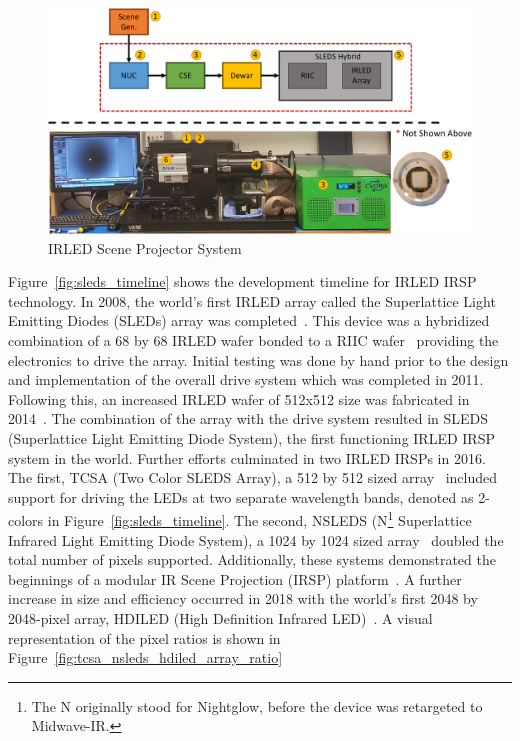     \begin{figure}
        \centering
        \includegraphics[width=1.0\textwidth]{fig/sleds_system.pdf}
        \caption{IRLED Scene Projector System}
        \label{fig:sleds_system}
    \end{figure}

    Figure~\ref{fig:sleds_timeline} shows the development timeline for IRLED IRSP technology. In 2008, the world's first IRLED array called the Superlattice Light Emitting Diodes (SLEDs) array was completed~\cite{AhmedEtAl2019}. This device was a hybridized combination of a 68 by 68 IRLED wafer bonded to a RIIC wafer~\cite{DasEtAl2009} providing the electronics to drive the array. Initial testing was done by hand prior to the design and implementation of the overall drive system which was completed in 2011. Following this, an increased IRLED wafer of 512x512 size was fabricated in 2014~\cite{NortonEtAl2013}. The combination of the array with the drive system resulted in SLEDS (Superlattice Light Emitting Diode System), the first functioning IRLED IRSP system in the world. Further efforts culminated in two IRLED IRSPs in 2016. The first, TCSA (Two Color SLEDS Array), a 512 by 512 sized array~\cite{McGeeEtAl2015, EjzakEtAl2016, EjzakEtAl2016_2, EjzakEtAl2017, RickerEtAl2017} included support for driving the LEDs at two separate wavelength bands, denoted as 2-colors in Figure~\ref{fig:sleds_timeline}. The second, NSLEDS (N\footnote{The N originally stood for Nightglow, before the device was retargeted to Midwave-IR.} Superlattice Infrared Light Emitting Diode System), a 1024 by 1024 sized array~\cite{BenedictEtAl2017,AhmedEtAl2020} doubled the total number of pixels supported. Additionally, these systems demonstrated the beginnings of a modular IR Scene Projection (IRSP) platform~\cite{BrowningEtAl2019}. A further increase in size and efficiency occurred in 2018 with the world's first 2048 by 2048-pixel array, HDILED (High Definition Infrared LED)~\cite{BenedictEtAl2018}. A visual representation of the pixel ratios is shown in Figure~\ref{fig:tcsa_nsleds_hdiled_array_ratio}

